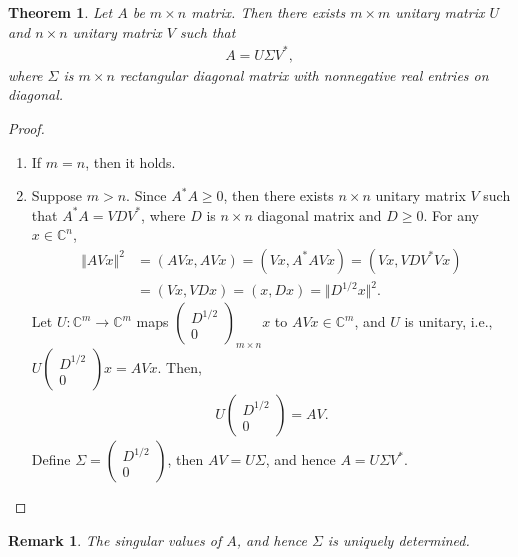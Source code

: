 \documentclass[11pt]{book}
\newtheorem{theorem}{Theorem}[section]
\newtheorem{remark}{Remark}[section]
\theoremstyle{definition}
\numberwithin{equation}{chapter}
\begin{document}
\begin{theorem}
Let $A$ be $m\times n$ matrix. Then there exists $m \times m$ unitary matrix $U$ and $n \times n$ unitary matrix $V$ such that
\begin{align*}
    A = U \Sigma V^*,
\end{align*}
where $\Sigma$ is $m \times n$ rectangular diagonal matrix with nonnegative real entries on diagonal.
\end{theorem}
\begin{proof}
~\begin{enumerate}[label=(\alph*)]
    \item If $m = n$, then it holds.
    
    \item Suppose $m > n$. Since $A^*A \geq 0$, then there exists $n \times n$ unitary matrix $V$ such that $A^*A = V D V^*$, where $D$ is $n \times n$ diagonal matrix and $D \geq 0$. For any $x \in \mathbb{C}^n$, 
    \begin{align*}
        \Vert AV x \Vert^2 & = (AVx, AVx) = (Vx, A^*AV x) = (Vx, V D V^* V x) \\
        & = (Vx, VDx) = (x, Dx) = \Vert D^{1/2} x \Vert^2.
    \end{align*}
    Let $U: \mathbb{C}^m \to \mathbb{C}^m$ maps $\begin{pmatrix}
        D^{1/2} \\
        0
    \end{pmatrix}_{m\times n}x$ to $AVx \in \mathbb{C}^m$, and $U$ is unitary, i.e., $U \begin{pmatrix} D^{1/2} \\ 0 \end{pmatrix}x = AVx$. Then, 
    \begin{align*}
        U \begin{pmatrix} D^{1/2} \\ 0 \end{pmatrix} = AV.
    \end{align*}
    Define $\Sigma = \begin{pmatrix} D^{1/2} \\ 0 \end{pmatrix}$, then $AV = U\Sigma$, and hence $A = U\Sigma V^*$.
\end{enumerate}
\end{proof}

\begin{remark}
The singular values of $A$, and hence $\Sigma$ is uniquely determined. 
\end{remark}
\end{document}

